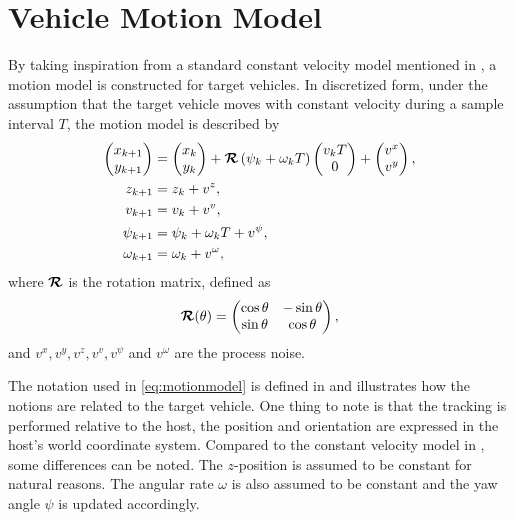 \section{Vehicle Motion Model}
By taking inspiration from a standard constant velocity model \eg mentioned in \cite{Gustafsson:2012}, a motion model is constructed for target vehicles.
In discretized form, under the assumption that the target vehicle moves with constant velocity during a sample interval $T$, the motion model is described by
%
\begin{subequations}
\label{eq:motionmodel}
\begin{align}
    \begin{pmatrix}
        x_{k+1} \\
        y_{k+1}
    \end{pmatrix}
    &=
    \begin{pmatrix}
        x_k \\
        y_k
    \end{pmatrix}
    +
    \bm{\mathcal{R}}\left(\psi_k + \omega_k T\right)
    \begin{pmatrix}
        v_k T \\
        0
    \end{pmatrix}
    +
    \begin{pmatrix}
    	v^x \\
    	v^y
    \end{pmatrix},
    \label{eq:motionmodel-1}
    \\
    z_{k+1} &= z_k + v^z,
    \label{eq:motionmodel-2}
    \\
    v_{k+1} &= v_k + v^v,
    \label{eq:motionmodel-3}
    \\
    \psi_{k+1} &= \psi_k + \omega_k T + v^\psi,
    \label{eq:motionmodel-4}
    \\
    \omega_{k+1} &= \omega_k + v^\omega,
    \label{eq:motionmodel-5}
\end{align}
\end{subequations}
%
where $\bm{\mathcal{R}}$ is the  rotation matrix, defined as
\begin{equation*}
	\bm{\mathcal{R}}(\theta) =
	\begin{pmatrix}
	\cos\theta & -\sin\theta \\
	\sin\theta & \cos\theta
	\end{pmatrix},
\end{equation*}
and $v^x, v^y, v^z, v^v, v^\psi$ and $v^\omega$ are the process noise.

The notation used in \eqref{eq:motionmodel} is defined in  and  illustrates how the notions are related to the target vehicle.
One thing to note is that the tracking is performed relative to the host, \ie the position and orientation are expressed in the host's world coordinate system.
Compared to the constant velocity model in \cite{Gustafsson:2012}, some differences can be noted.
The $z$-position is assumed to be constant for natural reasons.
The angular rate $\omega$ is also assumed to be constant and the yaw angle $\psi$ is updated accordingly.

